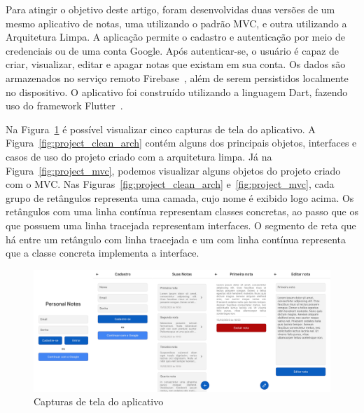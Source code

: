Para atingir o objetivo deste artigo, foram desenvolvidas duas versões de um mesmo aplicativo de notas, uma utilizando o padrão MVC, e outra utilizando a Arquitetura Limpa.
A aplicação permite o cadastro e autenticação por meio de credenciais ou de uma conta Google.
Após autenticar-se, o usuário é capaz de criar, visualizar, editar e apagar notas que existam em sua conta.
Os dados são armazenados no serviço remoto Firebase~\cite{firebase}, além de serem persistidos localmente no dispositivo.
O aplicativo foi construído utilizando a linguagem Dart, fazendo uso do framework Flutter~\cite{flutter}.

Na Figura~\ref{fig:screenshots} é possível visualizar cinco capturas de tela do aplicativo.
A Figura~\ref{fig:project_clean_arch} contém alguns dos principais objetos, interfaces e casos de uso do projeto criado com a arquitetura limpa.
Já na Figura~\ref{fig:project_mvc}, podemos visualizar alguns objetos do projeto criado com o MVC\@.
Nas Figuras~\ref{fig:project_clean_arch} e~\ref{fig:project_mvc}, cada grupo de retângulos representa uma camada, cujo nome é exibido logo acima.
Os retângulos com uma linha contínua representam classes concretas, ao passo que os que possuem uma linha tracejada representam interfaces.
O segmento de reta que há entre um retângulo com linha tracejada e um com linha contínua representa que a classe concreta implementa a interface.
\begin{figure}[ht]
	\centering
	\includegraphics[width=1\textwidth]{images/screenshots.png}
	\caption{Capturas de tela do aplicativo}
	\label{fig:screenshots}
\end{figure}

